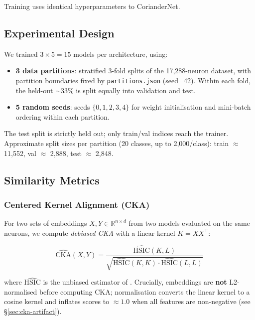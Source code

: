 Training uses identical hyperparameters to CorianderNet.

\subsection{Experimental Design}

We trained $3 \times 5 = 15$ models per architecture, using:
\begin{itemize}
  \item \textbf{3 data partitions}: stratified 3-fold splits of the 17,288-neuron
        dataset, with partition boundaries fixed by \texttt{partitions.json} (seed=42).
        Within each fold, the held-out $\sim$33\% is split equally into validation and test.
  \item \textbf{5 random seeds}: seeds $\{0,1,2,3,4\}$ for weight initialisation
        and mini-batch ordering within each partition.
\end{itemize}

The test split is strictly held out; only train/val indices reach the trainer.
Approximate split sizes per partition (20 classes, up to 2,000/class):
train $\approx$ 11,552, val $\approx$ 2,888, test $\approx$ 2,848.

\subsection{Similarity Metrics}

\subsubsection{Centered Kernel Alignment (CKA)}
\label{sec:cka}

For two sets of embeddings $X, Y \in \mathbb{R}^{n \times d}$ from two models
evaluated on the same neurons, we compute \emph{debiased CKA}
\citep{kornblith2019similarity} with a linear kernel $K = XX^\top$:

\begin{equation}
  \widehat{\text{CKA}}(X, Y) =
  \frac{\widehat{\text{HSIC}}(K, L)}
       {\sqrt{\widehat{\text{HSIC}}(K, K) \cdot \widehat{\text{HSIC}}(L, L)}}
\end{equation}

where $\widehat{\text{HSIC}}$ is the unbiased estimator of
\citet{song2012feature}.  Crucially, embeddings are \textbf{not} L2-normalised
before computing CKA; normalisation converts the linear kernel to a cosine
kernel and inflates scores to $\approx 1.0$ when all features are non-negative
(see \S\ref{sec:cka-artifact}).

